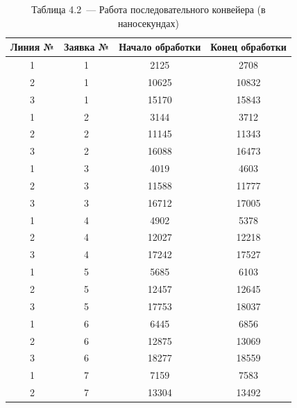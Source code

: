 \documentclass[12pt, a4paper]{report}
\begin{document}
	\begin{table} [H]
		\caption*{Таблица 4.2~--- Работа последовательного конвейера (в наносекундах)}
		\begin{tabular}[l]{|c c c c|}
			\hline
			Линия № & Заявка № & Начало обработки & Конец обработки  \\\hline
			
			1 & 1 & 2125 & 2708  \\ 
			
			2 & 1 & 10625 & 10832  \\ 
			
			3 & 1 & 15170 & 15843  \\\hline
			
			1 & 2 & 3144 & 3712  \\ 
			
			2 & 2 & 11145 & 11343  \\ 
			
			3 & 2 & 16088 & 16473  \\\hline
			
			1 & 3 & 4019 & 4603  \\ 
			
			2 & 3 & 11588 & 11777  \\ 
			
			3 & 3 & 16712 & 17005  \\\hline
			
			1 & 4 & 4902 & 5378  \\ 
			
			2 & 4 & 12027 & 12218  \\ 
			
			3 & 4 & 17242 & 17527  \\\hline
			
			1 & 5 & 5685 & 6103  \\ 
			
			2 & 5 & 12457 & 12645  \\ 
			
			3 & 5 & 17753 & 18037  \\\hline
			
			1 & 6 & 6445 & 6856  \\ 
			
			2 & 6 & 12875 & 13069  \\ 
			
			3 & 6 & 18277 & 18559  \\\hline
			
			1 & 7 & 7159 & 7583  \\ 
			
			2 & 7 & 13304 & 13492  \\ 
			

\end{tabular}
\end{table}
\end{document}
